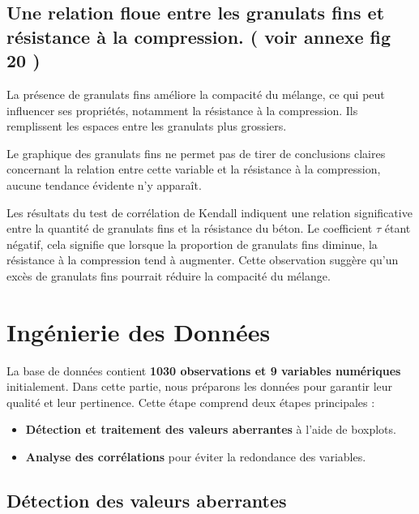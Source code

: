 \documentclass[
  12pt,
]{article}
\providecommand{\tightlist}{%
  \setlength{\itemsep}{0pt}\setlength{\parskip}{0pt}}
\begin{document}
\subsection{Une relation floue entre les granulats fins et résistance à
la compression. ( voir annexe fig 20
)}\label{une-relation-floue-entre-les-granulats-fins-et-ruxe9sistance-uxe0-la-compression.-voir-annexe-fig-20}

La présence de granulats fins améliore la compacité du mélange, ce qui
peut influencer ses propriétés, notamment la résistance à la
compression. Ils remplissent les espaces entre les granulats plus
grossiers.

Le graphique des granulats fins ne permet pas de tirer de conclusions
claires concernant la relation entre cette variable et la résistance à
la compression, aucune tendance évidente n'y apparaît.

Les résultats du test de corrélation de Kendall indiquent une relation
significative entre la quantité de granulats fins et la résistance du
béton. Le coefficient \(\tau\) étant négatif, cela signifie que lorsque
la proportion de granulats fins diminue, la résistance à la compression
tend à augmenter. Cette observation suggère qu'un excès de granulats
fins pourrait réduire la compacité du mélange.

\section{Ingénierie des Données}\label{inguxe9nierie-des-donnuxe9es}

La base de données contient \textbf{1030 observations et 9 variables
numériques} initialement. Dans cette partie, nous préparons les données
pour garantir leur qualité et leur pertinence. Cette étape comprend deux
étapes principales :

\begin{itemize}
\tightlist
\item
  \textbf{Détection et traitement des valeurs aberrantes} à l'aide de
  boxplots.\\
\item
  \textbf{Analyse des corrélations} pour éviter la redondance des
  variables.
\end{itemize}

\subsection{Détection des valeurs
aberrantes}\label{duxe9tection-des-valeurs-aberrantes}
\end{document}
